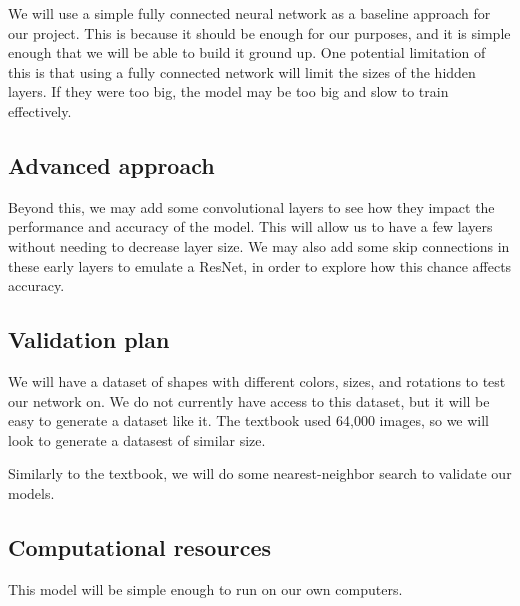 \documentclass{article}
\begin{document}
We will use a simple fully connected neural network as a baseline approach for our project. This is because it should be enough for our purposes, and it is simple enough that we will be able to build it ground up.  One potential limitation of this is that using a fully connected network will limit the sizes of the hidden layers.  If they were too big, the model may be too big and slow to train effectively.

\subsection{Advanced approach}

Beyond this, we may add some convolutional layers to see how they impact the performance and accuracy of the model. This will allow us to have a few layers without needing to decrease layer size.  We may also add some skip connections in these early layers to emulate a ResNet, in order to explore how this chance affects accuracy.

\subsection{Validation plan}

We will have a dataset of shapes with different colors, sizes, and rotations to test our network on.  We do not currently have access to this dataset, but it will be easy to generate a dataset like it.  The textbook used 64,000 images, so we will look to generate a datasest of similar size.

Similarly to the textbook, we will do some nearest-neighbor search to validate our models.

\subsection{Computational resources}

This model will be simple enough to run on our own computers.
\end{document}
